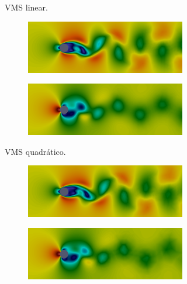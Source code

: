 \begin{figure}[h!]
\begin{subfigure}{\textwidth}
\begin{subfigure}{.42\textwidth}
        \end{subfigure}
        \caption{VMS linear.}
    \end{subfigure}
    \begin{subfigure}{\textwidth}\centering
        \begin{subfigure}{.42\textwidth}
            \includegraphics[width=\linewidth]{Figuras/cylinder/VMS-Qua2-vel.png}
        \end{subfigure}
        \begin{subfigure}{.42\textwidth}
            \includegraphics[width=\linewidth]{Figuras/cylinder/VMS-Qua2-pre.png}
        \end{subfigure}
        \caption{VMS quadrático.}
    \end{subfigure}
    \begin{subfigure}{\textwidth}\centering
        \begin{subfigure}{.42\textwidth}
            \includegraphics[width=\linewidth]{Figuras/cylinder/LES2-vel.png}
        \end{subfigure}
        \begin{subfigure}{.42\textwidth}
            \includegraphics[width=\linewidth]{Figuras/cylinder/LES2-pre.png}

\end{subfigure}
\end{subfigure}
\end{figure}
